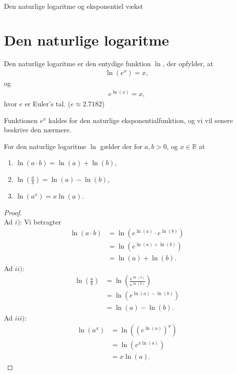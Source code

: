 \documentclass[12pt]{article}
\begin{document}


\begin{center}
\Huge
Den naturlige logaritme og eksponentiel vækst
\end{center}

\section*{Den naturlige logaritme}
\begin{defn}
Den naturlige logaritme er den entydige funktion $\ln$, der opfylder, at
\begin{align*}
\ln(e^x) = x, 
\end{align*}
og
\begin{align*}
e^{\ln(x)} = x,
\end{align*}
hvor $e$ er Euler's tal. ($e \approx 2.7182$)
\end{defn}
Funktionen $e^x$ kaldes for den naturlige eksponentialfunktion, og vi vil senere beskrive den nærmere.

\begin{setn}
For den naturlige logaritme $\ln$ gælder der for $a,b>0$, og $x\in \mathbb{R}$ at
\begin{enumerate}[label=\roman*)]
\item $\ln(a\cdot b) = \ln(a) + \ln(b)$,
\item $\ln(\frac{a}{b}) = \ln(a)-\ln(b)$,
\item $\ln(a^x) = x\ln(a)$.
\end{enumerate}
\end{setn}
\begin{proof}
\phantom{hej} \\
Ad $i)$: Vi betragter
\begin{align*}
\ln(a\cdot b) &= \ln(e^{\ln(a)}\cdot e^{\ln(b)})\\
&= \ln(e^{\ln(a)+\ln(b)}) \\
&= \ln(a) + \ln(b).
\end{align*}
Ad $ii)$: 
\begin{align*}
\ln\left(\frac{a}{b}\right) &= \ln\left(\frac{e^{\ln(a)}}{e^{\ln(b)}}\right)\\
&= \ln\left(e^{\ln(a)-\ln(b)}\right)\\
&= \ln(a)-\ln(b).
\end{align*}
Ad $iii)$:
\begin{align*}
\ln(a^x) &= \ln\left(\left(e^{\ln(a)}\right)^x\right)\\
&= \ln\left(e^{x\ln(a)} \right)\\
&= x\ln(a).
\end{align*}
\end{proof}
\end{document}
